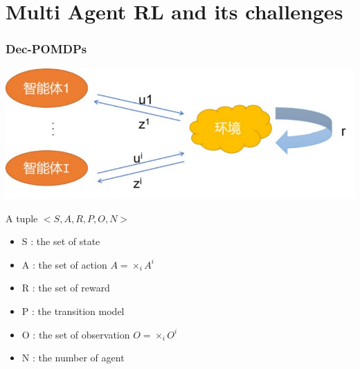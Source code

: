 \documentclass[notheorems, aspectratio=54]{beamer}
\begin{document}
\section{ Multi Agent RL and its challenges}
\begin{frame}
  \frametitle{Dec-POMDPs}
  \begin{minipage}{0.45\textwidth}
    \includegraphics[width=\textwidth]{dec_pomdp.png}
  \end{minipage}
  \hspace{0.05\linewidth} 
  \begin{minipage}{0.45\textwidth}
    \begin{center}
    A tuple $<S, A, R, P, O, N>$
    \end{center}
   \begin{itemize}
     \item S : the set of state
     \item A : the set of action $A = \times_{i}A^{i}$
     \item R : the set of reward 
     \item P : the transition model
     \item O : the set of observation $O = \times_{i}O^{i}$
     \item N : the number of agent
   \end{itemize}
  
  \end{minipage}
  \end{frame}
\end{document}
